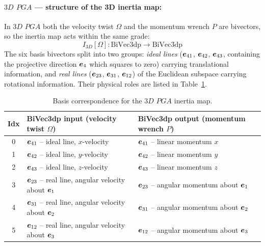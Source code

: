 \paragraph{$3D$ $PGA$ --- structure of the 3D inertia map:}
In $3D$ $PGA$ both the velocity twist $\Omega$ and the momentum wrench $P$ are bivectors,
so the inertia map acts within the same grade:
\begin{equation}
    I_{3D}[\Omega] : \mathrm{BiVec3dp} \to \mathrm{BiVec3dp}
\end{equation}
The six basis bivectors split into two groups: \emph{ideal lines} ($\bm{e}_{41}$, $\bm{e}_{42}$,
$\bm{e}_{43}$, containing the projective direction $\bm{e}_{4}$ which squares to zero) carrying
translational information, and \emph{real lines} ($\bm{e}_{23}$, $\bm{e}_{31}$, $\bm{e}_{12}$) of the
Euclidean subspace carrying rotational information. Their physical roles are listed in
Table~\ref{tab:basis_pga3dp}.

\begin{table}[h!]
\centering\small
\begin{tabular}{c|p{5.7cm}|p{5.7cm}}
\hline
Idx & BiVec3dp input (velocity twist $\Omega$) & BiVec3dp output (momentum wrench $P$) \\
\hline
0 & $\bm{e}_{41}$ -- ideal line, $x$-velocity &
$\bm{e}_{41}$ -- linear momentum $x$
\\
1 & $\bm{e}_{42}$ -- ideal line, $y$-velocity &
$\bm{e}_{42}$ -- linear momentum $y$
\\
2 & $\bm{e}_{43}$ -- ideal line, $z$-velocity &
$\bm{e}_{43}$ -- linear momentum $z$
\\
3 & $\bm{e}_{23}$ -- real line, angular velocity about $\bm{e}_{1}$ &
$\bm{e}_{23}$ -- angular momentum about $\bm{e}_{1}$
\\
4 & $\bm{e}_{31}$ -- real line, angular velocity about $\bm{e}_{2}$ &
$\bm{e}_{31}$ -- angular momentum about $\bm{e}_{2}$
\\
5 & $\bm{e}_{12}$ -- real line, angular velocity about $\bm{e}_{3}$ &
$\bm{e}_{12}$ -- angular momentum about $\bm{e}_{3}$
\\
\hline
\end{tabular}
\caption{Basis correspondence for the $3D$ $PGA$ inertia map.}
\label{tab:basis_pga3dp}
\end{table}

